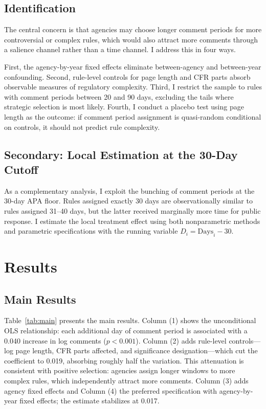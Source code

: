 \documentclass[12pt]{article}
\begin{document}
\subsection{Identification}

The central concern is that agencies may choose longer comment periods for more controversial or complex rules, which would also attract more comments through a salience channel rather than a time channel. I address this in four ways.

First, the agency-by-year fixed effects eliminate between-agency and between-year confounding. Second, rule-level controls for page length and CFR parts absorb observable measures of regulatory complexity. Third, I restrict the sample to rules with comment periods between 20 and 90 days, excluding the tails where strategic selection is most likely. Fourth, I conduct a placebo test using page length as the outcome: if comment period assignment is quasi-random conditional on controls, it should not predict rule complexity.

\subsection{Secondary: Local Estimation at the 30-Day Cutoff}

As a complementary analysis, I exploit the bunching of comment periods at the 30-day APA floor. Rules assigned exactly 30 days are observationally similar to rules assigned 31--40 days, but the latter received marginally more time for public response. I estimate the local treatment effect using both nonparametric methods \citep{calonico2014robust} and parametric specifications with the running variable $D_i = \text{Days}_i - 30$.

\section{Results}
\label{sec:results}

\subsection{Main Results}



Table~\ref{tab:main} presents the main results. Column (1) shows the unconditional OLS relationship: each additional day of comment period is associated with a 0.040 increase in log comments ($p < 0.001$). Column (2) adds rule-level controls---log page length, CFR parts affected, and significance designation---which cut the coefficient to 0.019, absorbing roughly half the variation. This attenuation is consistent with positive selection: agencies assign longer windows to more complex rules, which independently attract more comments. Column (3) adds agency fixed effects and Column (4) the preferred specification with agency-by-year fixed effects; the estimate stabilizes at 0.017.
\end{document}
